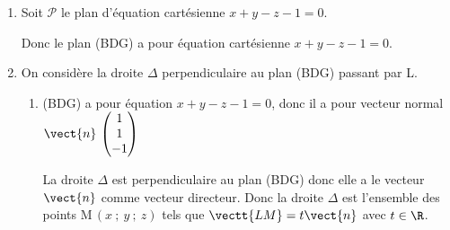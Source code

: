 \begin{enumerate}
\begin{enumerate}
{$\vectt{IL} = \dfrac{3}{4} \vectt{IG}	
\iff
\left \{
\begin{array}{l !{=} l}
x_{\text L} - \frac{1}{2} & \frac{3}{4} \times \frac{1}{2} \\ 
y_{\text L} - \frac{1}{2} & \frac{3}{4} \times \frac{1}{2}\\ 
z_{\text L} &\frac{3}{4} \times 1
\end{array}
\right .
\iff
\left \{
\begin{array}{l !{=}l}
x_{\text L} & \frac{3}{8} + \frac{1}{2} \\ 
y_{\text L} &\frac{3}{8} + \frac{1}{2}\\ 
z_{\text L} &\frac{3}{4}
\end{array}
\right .
\iff
\left \{
\begin{array}{l !{=}l}
x_{\text L} & \frac{7}{8} \\ 
y_{\text L} &\frac{7}{8}\\ 
z_{\text L} &\frac{3}{4}
\end{array}
\right .$
}
	\end{enumerate}
	
\item Soit $\mathcal{P}$ le plan d'équation cartésienne $x + y - z - 1 = 0$.


Donc le plan (BDG) a pour équation cartésienne $x + y - z - 1 = 0$.

\item On considère la droite $\Delta$ perpendiculaire au plan (BDG) passant par L.
	\begin{enumerate}
		\item 
(BDG) a pour équation $x+y-z-1=0$, donc il a pour vecteur normal
$\vect{n}\,\begin{pmatrix} 1 \\ 1 \\ -1\end{pmatrix}$

La droite $\Delta$ est perpendiculaire au plan (BDG) donc elle a le vecteur $\vect{n}$ comme vecteur directeur.
Donc la droite $\Delta$ est l'ensemble des points M\,$(x~;~y~;~z)$ tels que $\vectt{LM}=t\vect{n}$ avec $t\in\R$.


\end{enumerate}
\end{enumerate}
